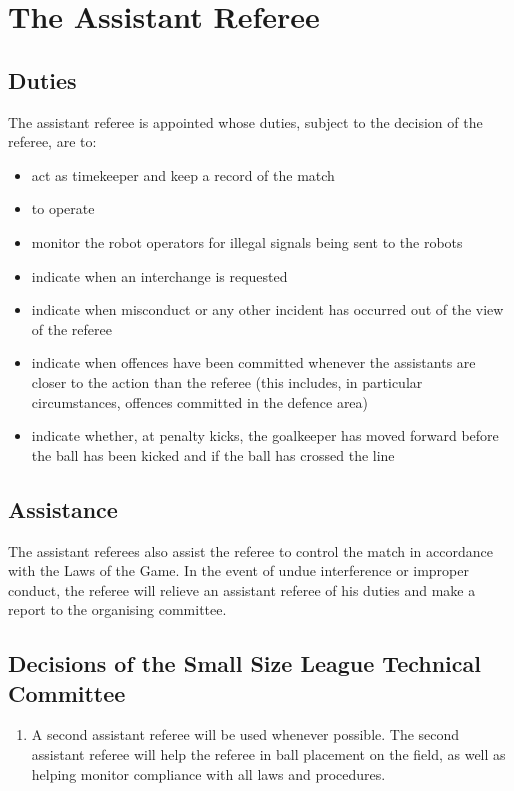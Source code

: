 \section{The Assistant Referee}\label{sec:assistant-referee}

\subsection{Duties}
The assistant referee is appointed whose duties, subject to the decision of the referee, are to:
\begin{itemize}
\item act as timekeeper and keep a record of the match
\item to operate  
\item monitor the robot operators for illegal signals being sent to the robots
\item indicate when an interchange is requested
\item indicate when misconduct or any other incident has occurred out of the view of the referee
\item indicate when offences have been committed whenever the assistants are closer to the action than the referee (this includes, in particular circumstances, offences committed in the defence area)
\item indicate whether, at penalty kicks, the goalkeeper has moved forward before the ball has been kicked and if the ball has crossed the line
\end{itemize}

\subsection{Assistance}
The assistant referees also assist the referee to control the match in accordance with the Laws of the Game.
In the event of undue interference or improper conduct, the referee will relieve an assistant referee of his duties and make a report to the organising committee.

\subsection*{Decisions of the Small Size League Technical Committee}
\begin{enumerate}
\item
A second assistant referee will be used whenever possible.
The second assistant referee will help the referee in ball placement on the field, as well as helping monitor compliance with all laws and procedures.
\end{enumerate}